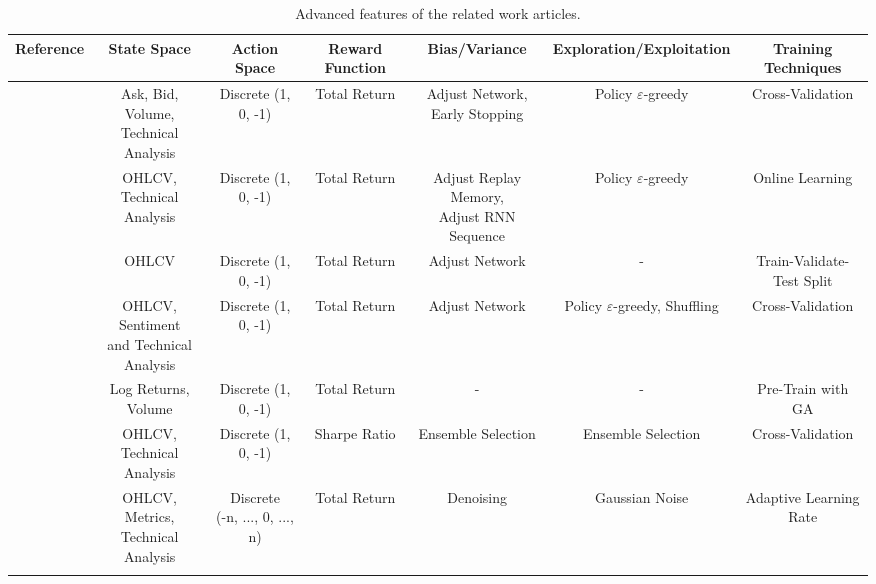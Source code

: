 \begin{table}
\centering
\footnotesize
\caption{Advanced features of the related work articles.}
\label{Tables:AdvancedRelatedWork}
\begin{tabularx}{\linewidth}{@{}ccccccc@{}}
\toprule
\textbf{Reference} & \textbf{State Space} & \textbf{Action Space} & \textbf{Reward Function} & \textbf{Bias/Variance} & \textbf{Exploration/Exploitation} & \textbf{Training Techniques} \\ 
\midrule

\cite{carapuco_reinforcement_2018} & \makecell{Ask, Bid, Volume, \\ Technical Analysis} & Discrete (1, 0, -1) & Total Return & \makecell{Adjust Network, \\ Early Stopping} & Policy \(\varepsilon\)-greedy & Cross-Validation \\
\addlinespace

\cite{huang_financial_2018} & \makecell{OHLCV, \\ Technical Analysis} & Discrete (1, 0, -1) & Total Return & \makecell{Adjust Replay Memory, \\ Adjust RNN Sequence} & Policy \(\varepsilon\)-greedy & Online Learning \\
\addlinespace

\cite{rundo_deep_2019} & OHLCV & Discrete (1, 0, -1) & Total Return & Adjust Network & - & Train-Validate-Test Split \\
\addlinespace

\cite{saini_stock_2019} & \makecell{OHLCV, Sentiment \\ and Technical Analysis} & Discrete (1, 0, -1) & Total Return & Adjust Network & Policy \(\varepsilon\)-greedy, Shuffling &  Cross-Validation \\
\addlinespace

\cite{gran_deep_2019} & Log Returns, Volume & Discrete (1, 0, -1) & Total Return & - & - & Pre-Train with GA \\
\addlinespace

\cite{kong_empirical_2023} & \makecell{OHLCV, \\ Technical Analysis} & Discrete (1, 0, -1) & Sharpe Ratio & Ensemble Selection & Ensemble Selection & Cross-Validation \\
\addlinespace

\cite{li_deep_2019} & \makecell{OHLCV, Metrics, \\ Technical Analysis } & \makecell{Discrete \\ (-n, ..., 0, ..., n)} & Total Return & Denoising & Gaussian Noise & Adaptive Learning Rate \\
\addlinespace


\end{tabularx}
\end{table}
